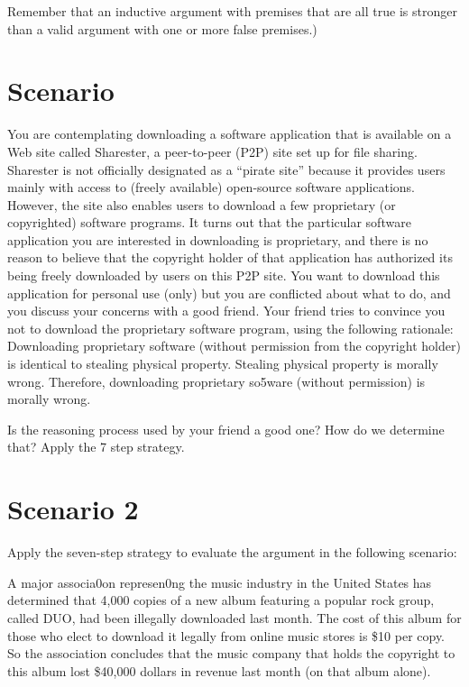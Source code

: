 \documentclass{article}
\begin{document}
\medskip

Remember that an inductive argument with premises that are all true is stronger than a valid argument with one or more false premises.)


\section{Scenario}

You are contemplating downloading a software application that is available on a Web site called Sharester, a peer-to-peer (P2P) site set up for file sharing.
Sharester is not officially designated as a “pirate site” because it provides users mainly with access to (freely available) open-source software applications.
However, the site also enables users to download a few proprietary (or copyrighted) software programs.
It turns out that the particular software application you are interested in downloading is proprietary, and there is no reason to believe that the copyright holder of that application has authorized its being freely downloaded by users on this P2P site.
You want to download this application for personal use (only) but you are conflicted about what to do, and you discuss your concerns with a good friend.
Your friend tries to convince you not to download the proprietary software program, using the following rationale: Downloading proprietary software (without permission from the copyright holder) is identical to stealing physical property.
 Stealing physical property is morally wrong.
 Therefore, downloading proprietary so5ware (without permission) is morally wrong.

\medskip

Is the reasoning process used by your friend a good one?
How do we determine that?
Apply the 7 step strategy.


\section{Scenario 2}
Apply the seven-step strategy to evaluate the argument in the following scenario:

A major associa0on represen0ng the music industry in the United States has determined that 4,000 copies of a new album featuring a popular rock group, called DUO, had been illegally downloaded last month.
The cost of this album for those who elect to download it legally from online music stores is \$10 per copy.
So the association concludes that the music company that holds the copyright to this album lost \$40,000 dollars in revenue last month (on that album alone).
\end{document}
